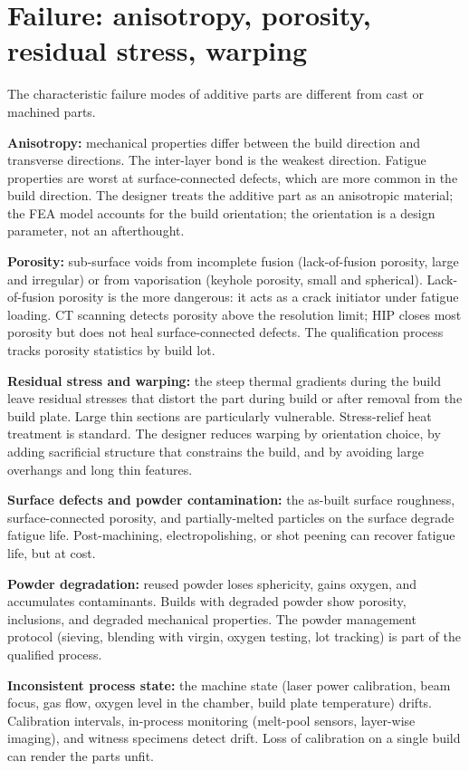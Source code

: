 \section{Failure: anisotropy, porosity, residual stress, warping}

The characteristic failure modes of additive parts are different from cast or machined parts.

\textbf{Anisotropy:} mechanical properties differ between the build direction and transverse directions. The inter-layer bond is the weakest direction. Fatigue properties are worst at surface-connected defects, which are more common in the build direction. The designer treats the additive part as an anisotropic material; the FEA model accounts for the build orientation; the orientation is a design parameter, not an afterthought.

\textbf{Porosity:} sub-surface voids from incomplete fusion (lack-of-fusion porosity, large and irregular) or from vaporisation (keyhole porosity, small and spherical). Lack-of-fusion porosity is the more dangerous: it acts as a crack initiator under fatigue loading. CT scanning detects porosity above the resolution limit; HIP closes most porosity but does not heal surface-connected defects. The qualification process tracks porosity statistics by build lot.

\textbf{Residual stress and warping:} the steep thermal gradients during the build leave residual stresses that distort the part during build or after removal from the build plate. Large thin sections are particularly vulnerable. Stress-relief heat treatment is standard. The designer reduces warping by orientation choice, by adding sacrificial structure that constrains the build, and by avoiding large overhangs and long thin features.

\textbf{Surface defects and powder contamination:} the as-built surface roughness, surface-connected porosity, and partially-melted particles on the surface degrade fatigue life. Post-machining, electropolishing, or shot peening can recover fatigue life, but at cost.

\textbf{Powder degradation:} reused powder loses sphericity, gains oxygen, and accumulates contaminants. Builds with degraded powder show porosity, inclusions, and degraded mechanical properties. The powder management protocol (sieving, blending with virgin, oxygen testing, lot tracking) is part of the qualified process.

\textbf{Inconsistent process state:} the machine state (laser power calibration, beam focus, gas flow, oxygen level in the chamber, build plate temperature) drifts. Calibration intervals, in-process monitoring (melt-pool sensors, layer-wise imaging), and witness specimens detect drift. Loss of calibration on a single build can render the parts unfit.

